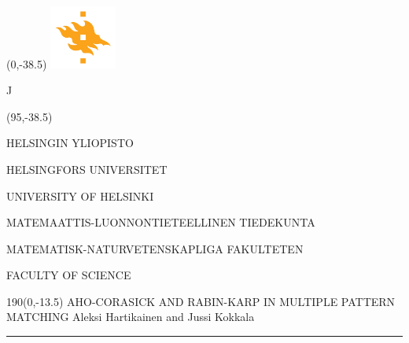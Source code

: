 \documentclass[a4paper]{article} %
\begin{document}
\pagestyle{empty} %




\begin{textblock}{95}(0,-38.5)
\includegraphics[width=22mm]{flame}
\end{textblock}	

J\begin{textblock}{95}(95,-38.5)
{\fontsize{8}{7}\selectfont\sffamily\color{unigray}
\hfill HELSINGIN YLIOPISTO

\hfill HELSINGFORS UNIVERSITET

\hfill UNIVERSITY OF HELSINKI

\color{sciorange}\hfill MATEMAATTIS-LUONNONTIETEELLINEN TIEDEKUNTA

\hfill MATEMATISK-NATURVETENSKAPLIGA FAKULTETEN

\hfill FACULTY OF SCIENCE %


}
\end{textblock}


\begin{textblock}{190}(0,-13.5)
{\sffamily\LARGE{{\color{sciorange}AHO-CORASICK AND RABIN-KARP\color{unigray} IN MULTIPLE PATTERN MATCHING}}}
\small\hfill Aleksi Hartikainen and Jussi Kokkala\\ %
\rule[2mm]{190mm}{0.3pt} %
\end{textblock}
\end{document}
